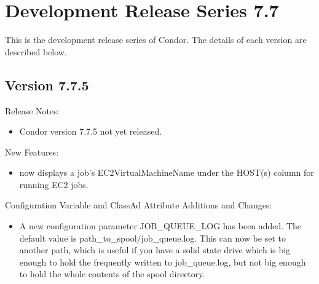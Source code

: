 
\section{\label{sec:History-7-7}Development Release Series 7.7}

This is the development release series of Condor.
The details of each version are described below.


\subsection*{\label{sec:New-7-7-5}Version 7.7.5}

\noindent Release Notes:

\begin{itemize}

\item Condor version 7.7.5 not yet released.

\end{itemize}


\noindent New Features:

\begin{itemize}

\item {}  now displays a job's EC2VirtualMachineName
  under the HOST(s) column for running EC2 jobs.

\end{itemize}

\noindent Configuration Variable and ClassAd Attribute Additions and Changes:

\begin{itemize}

\item A new configuration parameter JOB\_QUEUE\_LOG has been added.  The default
value is path\_to\_spool/job\_queue.log.  This can now be set to another path, which is
useful if you have a solid state drive which is big enough to hold the
frequently written to job\_queue.log, but not big enough to hold the whole
contents of the spool directory.

\end{itemize}

